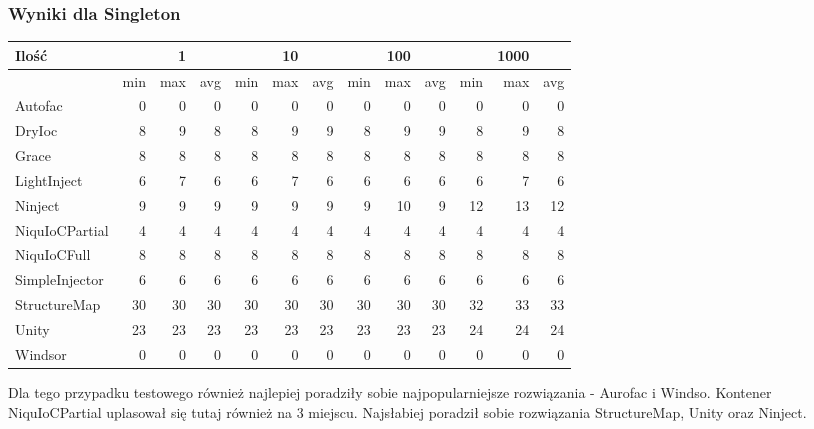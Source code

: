 \documentclass[12pt]{article}
\begin{document}
\subsubsection{Wyniki dla Singleton}
\begin{center}
\begin{small}
	\begin{tabular}{ | l | r r r | r r r | r r r | r r r | }
    		\hline
     		Ilość & & 1 & & & 10 & & & 100 & & & 1000 & \\ \hline
     		 & min & max & avg & min & max & avg & min & max & avg & min & max & avg \\ \hline
    		Autofac & 0 & 0 & 0 & 0 & 0 & 0 & 0 & 0 & 0 & 0 & 0 & 0 \\ \hline
   		DryIoc & 8 & 9 & 8 & 8 & 9 & 9 & 8 & 9 & 9 & 8 & 9 & 8 \\ \hline
		Grace & 8 & 8 & 8 & 8 & 8 & 8 & 8 & 8 & 8 & 8 & 8 & 8 \\ \hline
		LightInject & 6 & 7 & 6 & 6 & 7 & 6 & 6 & 6 & 6 & 6 & 7 & 6 \\ \hline
		Ninject & 9 & 9 & 9 & 9 & 9 & 9 & 9 & 10 & 9 & 12 & 13 & 12 \\ \hline
		NiquIoCPartial & 4 & 4 & 4 & 4 & 4 & 4 & 4 & 4 & 4 & 4 & 4 & 4 \\ \hline
		NiquIoCFull & 8 & 8 & 8 & 8 & 8 & 8 & 8 & 8 & 8 & 8 & 8 & 8 \\ \hline
		SimpleInjector & 6 & 6 & 6 & 6 & 6 & 6 & 6 & 6 & 6 & 6 & 6 & 6 \\ \hline
		StructureMap & 30 & 30 & 30 & 30 & 30 & 30 & 30 & 30 & 30 & 32 & 33 & 33 \\ \hline
		Unity & 23 & 23 & 23 & 23 & 23 & 23 & 23 & 23 & 23 & 24 & 24 & 24 \\ \hline
		Windsor & 0 & 0 & 0 & 0 & 0 & 0 & 0 & 0 & 0 & 0 & 0 & 0 \\
    		\hline
  	\end{tabular}
\end{small}
\end{center}
Dla tego przypadku testowego również najlepiej poradziły sobie najpopularniejsze rozwiązania - Aurofac i Windso. Kontener NiquIoCPartial uplasował się tutaj również na 3 miejscu. Najsłabiej poradził sobie rozwiązania StructureMap, Unity oraz Ninject.
\end{document}
